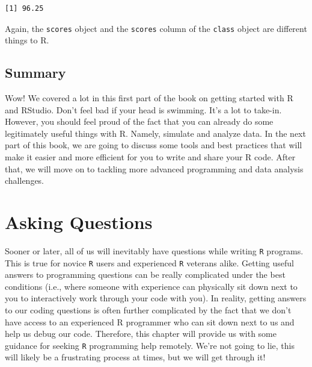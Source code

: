 \documentclass[
  letterpaper,
  DIV=11,
  numbers=noendperiod]{scrreprt}
\newenvironment{Shaded}{\begin{snugshade}}{\end{snugshade}}
\newcommand{\FunctionTok}[1]{\textcolor[rgb]{0.28,0.35,0.67}{#1}}
\newcommand{\NormalTok}[1]{\textcolor[rgb]{0.00,0.23,0.31}{#1}}
\newcommand{\SpecialCharTok}[1]{\textcolor[rgb]{0.37,0.37,0.37}{#1}}
\begin{document}
\begin{Shaded}
\end{Shaded}

\begin{verbatim}
[1] 96.25
\end{verbatim}

Again, the \texttt{scores} object and the \texttt{scores} column of the
\texttt{class} object are different things to R.

\section{Summary}\label{summary}

Wow! We covered a lot in this first part of the book on getting started
with R and RStudio. Don't feel bad if your head is swimming. It's a lot
to take-in. However, you should feel proud of the fact that you can
already do some legitimately useful things with R. Namely, simulate and
analyze data. In the next part of this book, we are going to discuss
some tools and best practices that will make it easier and more
efficient for you to write and share your R code. After that, we will
move on to tackling more advanced programming and data analysis
challenges.

\chapter{Asking Questions}\label{asking-questions}

Sooner or later, all of us will inevitably have questions while writing
\texttt{R} programs. This is true for novice \texttt{R} users and
experienced \texttt{R} veterans alike. Getting useful answers to
programming questions can be really complicated under the best
conditions (i.e., where someone with experience can physically sit down
next to you to interactively work through your code with you). In
reality, getting answers to our coding questions is often further
complicated by the fact that we don't have access to an experienced R
programmer who can sit down next to us and help us debug our code.
Therefore, this chapter will provide us with some guidance for seeking
\texttt{R} programming help remotely. We're not going to lie, this will
likely be a frustrating process at times, but we will get through it!
\end{document}
